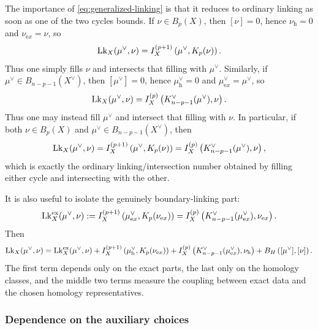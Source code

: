The importance of \eqref{eq:generalized-linking} is that it reduces to ordinary linking
as soon as one of the two cycles bounds. If \(\nu\in B_p(X)\), then \([\nu]=0\), hence \(\nu_{\mathrm h}=0\) and
\(\nu_{\mathrm ex}=\nu\), so
\begin{equation}
	\mathrm{Lk}_X(\mu^\vee,\nu)
	=
	I_X^{(p+1)}\left(\mu^\vee,K_p(\nu)\right).
	\label{eq:primal-exact}
\end{equation}
Thus one simply fills \(\nu\) and intersects that filling with \(\mu^\vee\). Similarly, if \(\mu^\vee\in B_{n-p-1}(X^\vee)\), then \([\mu^\vee]=0\), hence
\(\mu^\vee_{\mathrm h}=0\) and \(\mu^\vee_{\mathrm ex}=\mu^\vee\), so
\begin{equation}
	\mathrm{Lk}_X(\mu^\vee,\nu)
	=
	I_X^{(p)}\left(K^\vee_{n-p-1}(\mu^\vee),\nu\right).
	\label{eq:dual-exact}
\end{equation}
Thus one may instead fill \(\mu^\vee\) and intersect that filling with \(\nu\). In particular, if both \(\nu\in B_p(X)\) and \(\mu^\vee\in B_{n-p-1}(X^\vee)\), then
\begin{equation}
	\mathrm{Lk}_X(\mu^\vee,\nu)
	=
	I_X^{(p+1)}\left(\mu^\vee,K_p(\nu)\right)
	=
	I_X^{(p)}\left(K^\vee_{n-p-1}(\mu^\vee),\nu\right),
	\label{eq:boundary-linking}
\end{equation}
which is exactly the ordinary linking/intersection number obtained by filling either cycle
and intersecting with the other.

It is also useful to isolate the genuinely boundary-linking part:
\begin{equation}
	\mathrm{Lk}_X^{\mathrm{ex}}(\mu^\vee,\nu)
	:=
	I_X^{(p+1)}\left(\mu^\vee_{\mathrm ex},K_p(\nu_{\mathrm ex})\right)
	=
	I_X^{(p)}\left(K^\vee_{n-p-1}(\mu^\vee_{\mathrm ex}),\nu_{\mathrm ex}\right).
	\label{eq:exact-linking}
\end{equation}
Then
\begin{equation}
	\mathrm{Lk}_X(\mu^\vee,\nu)
	=
	\mathrm{Lk}_X^{\mathrm{ex}}(\mu^\vee,\nu)
	+
	I_X^{(p+1)}\left(\mu^\vee_{\mathrm h},K_p(\nu_{\mathrm ex})\right)
	+
	I_X^{(p)}\left(K^\vee_{n-p-1}(\mu^\vee_{\mathrm ex}),\nu_{\mathrm h}\right)
	+
	B_H\left([\mu^\vee],[\nu]\right).
	\label{eq:linking-decomposition}
\end{equation}
The first term depends only on the exact parts, the last only on the homology classes, and
the middle two terms measure the coupling between exact data and the chosen homology
representatives.

\subsubsection{Dependence on the auxiliary choices}

